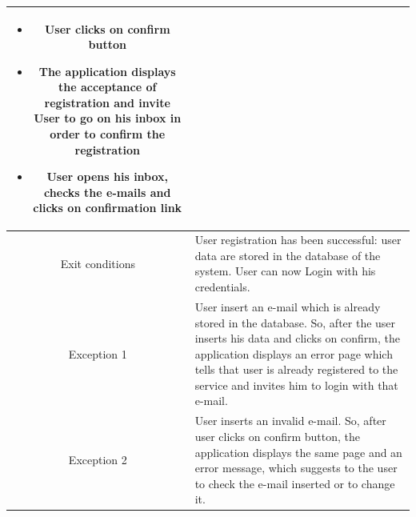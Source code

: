 \documentclass[table, 12pt]{article}
\begin{document}
\begin{longtable}{ | c | p{10cm} | }
\begin{itemize}
        \item User clicks on confirm button
        \item The application displays the acceptance of registration and invite User to go on his inbox in order to confirm the registration
        \item User opens his inbox, checks the e-mails and clicks on confirmation link
    \end{itemize}                                                                                                                                                                                                                                             \\
    \hline
    Exit conditions  & User registration has been successful: user data are stored in the database of the system. User can now Login with his credentials.                                                                                                                                    \\
    \hline
    \hline
    Exception 1      & User insert an e-mail which is already stored in the database. So, after the user inserts his data and clicks on confirm, the application displays an error page which tells that user is already registered to the service and invites him to login with that e-mail. \\
    \hline
    Exception 2      & User inserts an invalid e-mail. So, after user clicks on confirm button, the application displays the same page and an error message, which suggests to the user to check the e-mail inserted or to change it.                                                         \\
    \hline
\end{longtable}
\end{document}
